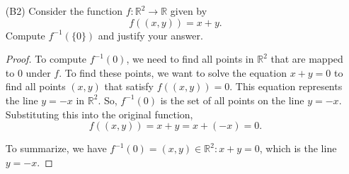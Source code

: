 \documentclass{article}
\begin{document}
\begin{itemize}
	\item [(B2)] Consider the function $f : \mathbb{R}^2 \rightarrow \mathbb{R}$ given by
		\[
			f((x,y)) = x + y.
		\]
		Compute $f^{-1}( \{ 0 \} )$ and justify your answer.
            \begin{proof}
                To compute $f^{-1}({0})$, we need to find all points in $\mathbb{R}^2$ that are mapped to 0 under $f$. To find these points, we want to solve the equation $x+y=0$ to find all points $(x,y)$ that satisfy $f((x,y))=0$.
                This equation represents the line $y=-x$ in $\mathbb{R}^2$. So, $f^{-1}({0})$ is the set of all points on the line $y=-x$. Substituting this into the original function,
                \[
                    f((x, y)) = x + y = x + (\minus x) = 0.
                \]

To summarize, we have $f^{-1}({0}) = {(x,y) \in \mathbb{R}^2 : x+y = 0}$, which is the line $y=-x$.
            \end{proof}
\end{itemize}
\end{document}
